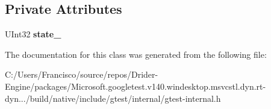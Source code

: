 \subsection*{Private Attributes}
\begin{DoxyCompactItemize}
\item 
\mbox{\label{classtesting_1_1internal_1_1_random_ad500e33e3342415afb8a3ab242afa9cc}} 
U\+Int32 {\bfseries state\+\_\+}
\end{DoxyCompactItemize}


The documentation for this class was generated from the following file\+:\begin{DoxyCompactItemize}
\item 
C\+:/\+Users/\+Francisco/source/repos/\+Drider-\/\+Engine/packages/\+Microsoft.\+googletest.\+v140.\+windesktop.\+msvcstl.\+dyn.\+rt-\/dyn.../build/native/include/gtest/internal/gtest-\/internal.\+h\end{DoxyCompactItemize}
